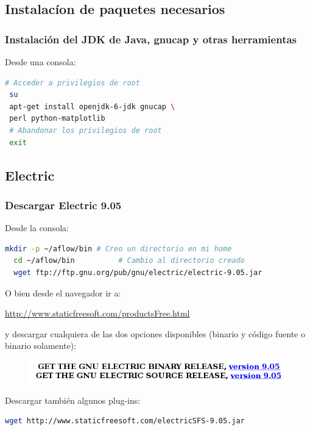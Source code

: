 \documentclass{beamer}
\begin{document}
\begin{frame}[fragile]
\subsection{Instalacíon de paquetes necesarios } %

\frametitle{Instalación del JDK de Java, gnucap y otras herramientas}

\noindent Desde una consola:
\begin{lstlisting}[language=bash]
 # Acceder a privilegios de root
 su
 apt-get install openjdk-6-jdk gnucap \
 perl python-matplotlib
 # Abandonar los privilegios de root
 exit
\end{lstlisting}
\end{frame}

\subsection{Electric}
\begin{frame}[fragile]
\frametitle{Descargar Electric 9.05}

\noindent Desde la consola:
\begin{scriptsize}
\begin{lstlisting}[language=bash]
  mkdir -p ~/aflow/bin # Creo un directorio en mi home
  cd ~/aflow/bin	      # Cambio al directorio creado
  wget ftp://ftp.gnu.org/pub/gnu/electric/electric-9.05.jar
\end{lstlisting}
\end{scriptsize}

O bien desde el navegador ir a:

 \url{http://www.staticfreesoft.com/productsFree.html}

y descargar cualquiera de las dos opciones disponibles (binario y código fuente o binario solamente):
\begin{figure}
\includegraphics[width=0.8\linewidth]{figuras/downloadElectric.png}
\end{figure}
Descargar también algunos plug-ins:
\begin{scriptsize}
\begin{lstlisting}[language=bash]
  wget http://www.staticfreesoft.com/electricSFS-9.05.jar
\end{lstlisting}
\end{scriptsize}
\end{frame}
\end{document}
